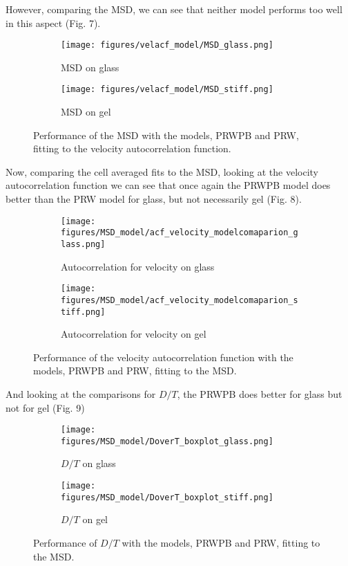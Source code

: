 \documentclass[12pt]{article}
\begin{document}
However, comparing the MSD, we can see that neither model performs too well in this aspect (Fig. 7).

\begin{figure}[h!]
  \centering
  \begin{subfigure}[b]{0.4\linewidth}
    \texttt{[image: figures/velacf\_model/MSD\_glass.png]}
    \caption{MSD on glass}
  \end{subfigure}
  \begin{subfigure}[b]{0.4\linewidth}
    \texttt{[image: figures/velacf\_model/MSD\_stiff.png]}
    \caption{MSD on gel}
  \end{subfigure}
  \caption{Performance of the MSD with the models, PRWPB and PRW, fitting to the velocity autocorrelation function.}
\end{figure}

Now, comparing the cell averaged fits to the MSD, looking at the velocity autocorrelation function we can see that once again the PRWPB model does better than the PRW model for glass, but not necessarily gel (Fig. 8).

\begin{figure}[h!]
  \centering
  \begin{subfigure}[b]{0.4\linewidth}
    \texttt{[image: figures/MSD\_model/acf\_velocity\_modelcomaparion\_glass.png]}
    \caption{Autocorrelation for velocity on glass}
  \end{subfigure}
  \begin{subfigure}[b]{0.4\linewidth}
    \texttt{[image: figures/MSD\_model/acf\_velocity\_modelcomaparion\_stiff.png]}
    \caption{Autocorrelation for velocity on gel}
  \end{subfigure}
  \caption{Performance of the velocity autocorrelation function with the models, PRWPB and PRW, fitting to the MSD.}
\end{figure}

And looking at the comparisons for $D/T$, the PRWPB does better for glass but not for gel (Fig. 9)

\begin{figure}[h!]
  \centering
  \begin{subfigure}[b]{0.4\linewidth}
    \texttt{[image: figures/MSD\_model/DoverT\_boxplot\_glass.png]}
    \caption{$D/T$ on glass}
  \end{subfigure}
  \begin{subfigure}[b]{0.4\linewidth}
    \texttt{[image: figures/MSD\_model/DoverT\_boxplot\_stiff.png]}
    \caption{$D/T$ on gel}
  \end{subfigure}
  \caption{Performance of $D/T$ with the models, PRWPB and PRW, fitting to the MSD.}
\end{figure}
\end{document}
